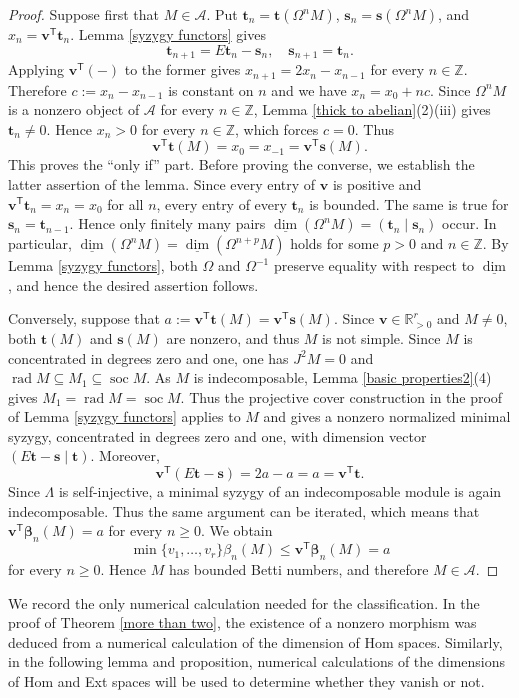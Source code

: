 \documentclass{amsart}
\theoremstyle{definition}
\theoremstyle{remark}
\numberwithin{equation}{thm}
\def\A{\mathcal{A}}
\def\dimvec{\underline{\dim}}
\def\dim{\operatorname{dim}}
\def\L{\Lambda}
\def\le{\leqslant}
\def\ge{\geqslant}
\def\rad{\operatorname{rad}}
\def\soc{\operatorname{soc}}
\def\T{\mathsf{T}}
\def\Z{\mathbb{Z}}
\def\bfs{\mathbf{s}}
\def\bft{\mathbf{t}}
\def\bfv{\mathbf{v}}
\begin{document}
\begin{proof}
Suppose first that $M\in\A$.
Put $\bft_n=\bft(\Omega^nM)$, $\bfs_n=\bfs(\Omega^nM)$, and $x_n=\bfv^{\T}\bft_n$.
Lemma \ref{syzygy functors} gives
$$
\bft_{n+1}=E\bft_n-\bfs_n, \quad \bfs_{n+1}=\bft_n.
$$
Applying $\bfv^{\T}(-)$ to the former gives $x_{n+1}=2x_n-x_{n-1}$ for every $n\in\Z$.
Therefore $c:=x_n-x_{n-1}$ is constant on $n$ and we have $x_n=x_0+nc$.
Since $\Omega^nM$ is a nonzero object of $\A$ for every $n\in\Z$, Lemma \ref{thick to abelian}(2)(iii) gives $\bft_n\ne0$. Hence $x_n>0$ for every $n\in\Z$, which forces $c=0$. Thus
$$
\bfv^{\T}\bft(M)=x_0=x_{-1}=\bfv^{\T}\bfs(M).
$$
This proves the ``only if'' part. Before proving the converse, we establish the latter assertion of the lemma.
Since every entry of $\bfv$ is positive and $\bfv^{\T}\bft_n=x_n=x_0$ for all $n$, every entry of every $\bft_n$ is bounded.
The same is true for $\bfs_n=\bft_{n-1}$.
Hence only finitely many pairs $\dimvec(\Omega^n M)=(\bft_n\mid\bfs_n)$ occur. 
In particular, $\dimvec(\Omega^n M)=\dimvec(\Omega^{n+p} M)$ holds for some $p>0$ and $n\in\Z$. By Lemma \ref{syzygy functors}, both $\Omega$ and $\Omega^{-1}$ preserve equality with respect to $\dimvec$, and hence the desired assertion follows.

Conversely, suppose that $a:=\bfv^{\T}\bft(M)=\bfv^{\T}\bfs(M)$.
Since $\bfv\in\mathbb R_{>0}^r$ and $M\ne 0$, both $\bft(M)$ and $\bfs(M)$ are nonzero, and thus $M$ is not simple.
Since $M$ is concentrated in degrees zero and one, one has $J^2M=0$ and
$\rad M\subseteq M_1\subseteq\soc M$.
As $M$ is indecomposable, Lemma \ref{basic properties2}(4) gives $M_1=\rad M=\soc M$.
Thus the projective cover construction in the proof of Lemma \ref{syzygy functors} applies to $M$ and gives a nonzero normalized minimal syzygy, concentrated in degrees zero and one, with dimension vector $(E\bft-\bfs\mid\bft)$.
Moreover,
$$
\bfv^{\T}(E\bft-\bfs)=2a-a=a=\bfv^{\T}\bft.
$$
Since $\L$ is self-injective, a minimal syzygy of an indecomposable module is again indecomposable. Thus the same argument can be iterated, which means that $\bfv^{\T}\boldsymbol{\beta}_n(M)=a$ for every $n\ge 0$.
We obtain
$$
\min\{v_1,\ldots,v_r\}\beta_n(M)
\le \bfv^{\T}\boldsymbol{\beta}_n(M)
=a
$$
for every $n\ge0$.
Hence $M$ has bounded Betti numbers, and therefore $M\in\A$.
\end{proof}

We record the only numerical calculation needed for the classification.
In the proof of Theorem \ref{more than two}, the existence of a nonzero morphism was deduced from a numerical calculation of the dimension of Hom spaces.
Similarly, in the following lemma and proposition, numerical calculations of the dimensions of Hom and Ext spaces will be used to determine whether they vanish or not.
\end{document}
